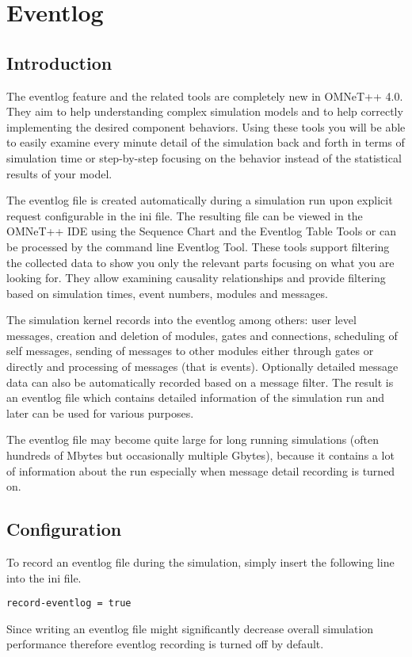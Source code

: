 \chapter{Eventlog}
\label{cha:eventlog}

\section{Introduction}
The eventlog feature and the related tools are completely new in OMNeT++ 4.0. They aim to
help understanding complex simulation models and to help correctly implementing the
desired component behaviors. Using these tools you will be able to easily examine every
minute detail of the simulation back and forth in terms of simulation time or step-by-step
focusing on the behavior instead of the statistical results of your model.

The eventlog file is created automatically during a simulation run upon explicit request
configurable in the ini file. The resulting file can be viewed in the OMNeT++ IDE using
the Sequence Chart and the Eventlog Table Tools or can be processed by the command line
Eventlog Tool. These tools support filtering the collected data to show you only the
relevant parts focusing on what you are looking for. They allow examining causality
relationships and provide filtering based on simulation times, event numbers, modules and
messages.

The simulation kernel records into the eventlog among others: user level messages,
creation and deletion of modules, gates and connections, scheduling of self messages,
sending of messages to other modules either through gates or directly and processing of
messages (that is events). Optionally detailed message data can also be automatically
recorded based on a message filter. The result is an eventlog file which contains detailed
information of the simulation run and later can be used for various purposes.

\begin{note}
The eventlog file may become quite large for long running simulations (often hundreds of
Mbytes but occasionally multiple Gbytes), because it contains a lot of information about
the run especially when message detail recording is turned on.
\end{note}

\section{Configuration}
To record an eventlog file during the simulation, simply insert the following line into
the ini file.
\begin{verbatim}
record-eventlog = true
\end{verbatim}
\begin{note}
Since writing an eventlog file might significantly decrease overall simulation performance
therefore eventlog recording is turned off by default.
\end{note}


